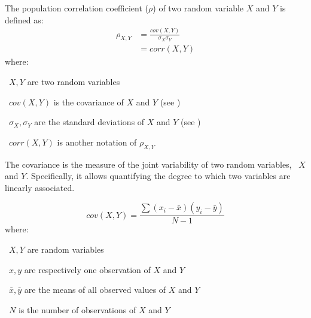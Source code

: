 The population correlation coefficient ($\rho$) of two random variable $X$ and $Y$
is defined as:
\begin{equation}\label{eq:PearsonPopCor}
     \tag{Population correlation coefficient}
     \begin{split}
         \rho_{X,Y} & = \frac{cov(X,Y)}{\sigma_X \sigma_Y}\\
                    & = corr(X,Y)
     \end{split}
\end{equation}
where:
\quad\begin{eqlist}[\setlength{\itemsep}{0em}%
            \setlength{\topsep}{0em}%
            \setlength{\partopsep}{0em}%
            \setlength{\parskip}{0em}%
            \setlength{\parsep}{0em}]
    \item[\textbullet\ $X,Y$] are two random variables
    \item[\textbullet\ $cov(X,Y)$] is the covariance of $X$ and $Y$
        (see )
    \item[\textbullet\ $\sigma_{X},\sigma_{Y}$] are the standard deviations
        of $X$ and $Y$ (see )
    \item[\textbullet\ $corr(X,Y)$] is another notation of $\rho_{X,Y}$
\end{eqlist}

The covariance is the measure of the joint variability of two random variables,
\eg\ $X$ and $Y$.
Specifically, it allows quantifying the degree to which
two variables are linearly associated.

\begin{equation}
    \tag{Covariance}\label{eq:covariance}
        cov(X,Y) =  \frac{\sum{(x_{i}-\bar{x})(y_{i}-\bar{y})}}{N-1}
\end{equation}
where:
\quad\begin{eqlist}[\setlength{\itemsep}{0em}%
            \setlength{\topsep}{0em}%
            \setlength{\partopsep}{0em}%
            \setlength{\parskip}{0em}%
            \setlength{\parsep}{0em}]
       \item[\textbullet\ $X,Y$] are random variables
       \item[\textbullet\ $x,y$] are respectively one observation of $X$ and $Y$
       \item[\textbullet\ $\bar{x},\bar{y}$] are the means
           of all observed values of $X$ and $Y$
       \item[\textbullet\ $N$] is the number of observations of $X$ and $Y$
\end{eqlist}

